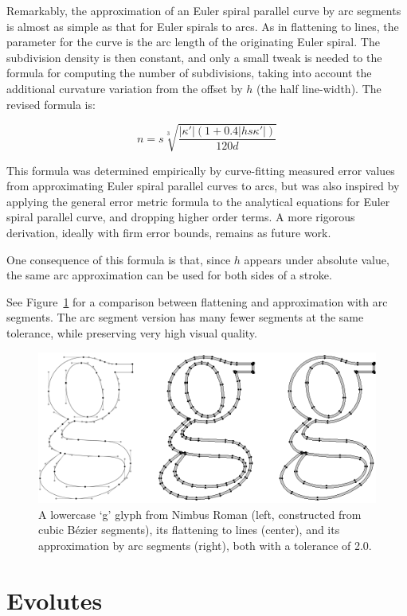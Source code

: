 \documentclass[sigconf]{acmart}
\begin{document}
Remarkably, the approximation of an Euler spiral parallel curve by arc segments is almost as simple as that for Euler spirals to arcs. As in flattening to lines, the parameter for the curve is the arc length of the originating Euler spiral. The subdivision density is then constant, and only a small tweak is needed to the formula for computing the number of subdivisions, taking into account the additional curvature variation from the offset by $h$ (the half line-width). The revised formula is:

\[
    n = s\sqrt[3]{\frac{|\kappa'|(1+0.4|hs\kappa'|)}{120d}}
\]

This formula was determined empirically by curve-fitting measured error values from approximating Euler spiral parallel curves to arcs, but was also inspired by applying the general error metric formula to the analytical equations for Euler spiral parallel curve, and dropping higher order terms. A more rigorous derivation, ideally with firm error bounds, remains as future work.

One consequence of this formula is that, since $h$ appears under absolute value, the same arc approximation can be used for both sides of a stroke.

See Figure~\ref{fig:g_comparison} for a comparison between flattening and approximation with arc segments. The arc segment version has many fewer segments at the same tolerance, while preserving very high visual quality.

\begin{figure}
    \includegraphics[scale=0.65]{g_comparison}
    \caption{A lowercase `g' glyph from Nimbus Roman (left, constructed from cubic Bézier segments), its flattening to lines (center), and its approximation by arc segments (right), both with a tolerance of 2.0.}
    \label{fig:g_comparison}
\end{figure}


\section{Evolutes}
\end{document}
